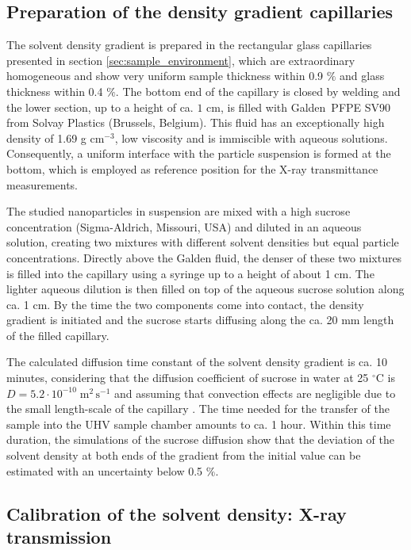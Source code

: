 \subsection{Preparation of the density gradient capillaries}
\label{sec:GradientPreparation}
The solvent density gradient is prepared in the rectangular glass capillaries presented in section \ref{sec:sample_environment}, which are extraordinary homogeneous and show very uniform sample thickness within 0.9 $\%$ and glass thickness within 0.4 $\%$. The bottom end of the capillary is closed by welding and the lower section, up to a height of ca. \(1\) cm, is filled with Galden\textregistered\ PFPE SV90 from Solvay Plastics (Brussels, Belgium). This fluid has an exceptionally high density of 1.69 g cm$^{-3}$, low viscosity and is immiscible with aqueous solutions. Consequently, a uniform interface with the particle suspension is formed at the bottom, which is employed as reference position for the X-ray transmittance measurements. 

The studied nanoparticles in suspension are mixed with a high sucrose concentration (Sigma-Aldrich, Missouri, USA) and diluted in an aqueous solution, creating two mixtures with different solvent densities but equal particle concentrations. Directly above the Galden fluid, the denser of these two mixtures is filled into the capillary using a syringe up to a height of about 1 cm. The lighter aqueous dilution is then filled on top of the aqueous sucrose solution along ca. 1 cm. By the time the two components come into contact, the density gradient is initiated and the sucrose starts diffusing along the ca. 20 mm length of the filled capillary.

The calculated diffusion time constant of the solvent density gradient is ca. 10 minutes, considering that the diffusion coefficient of sucrose in water at 25 $^{\circ}$C is $D=5.2 \cdot 10^{-10} \;\mbox{m}^2\,\mbox{s}^{-1}$ \citep{uedaira_sugar-water_1985,ribeiro_binary_2006} and assuming that convection effects are negligible due to the small length-scale of the capillary \citep{berberan-santos_barometric_1997}. The time needed for the transfer of the sample into the UHV sample chamber amounts to ca. 1 hour. Within this time duration, the simulations of the sucrose diffusion show that the deviation of the solvent density at both ends of the gradient from the initial value can be estimated with an uncertainty below 0.5 $\%$.


\subsection{Calibration of the solvent density: X-ray transmission}
\label{sec:SolventCalibration}

